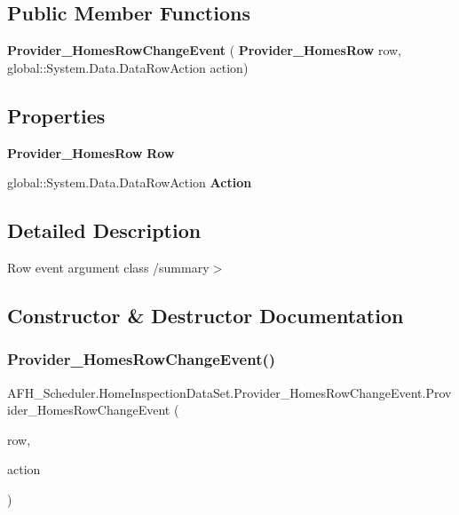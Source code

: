 \subsection*{Public Member Functions}
\begin{DoxyCompactItemize}
\item 
\textbf{ Provider\+\_\+\+Homes\+Row\+Change\+Event} (\textbf{ Provider\+\_\+\+Homes\+Row} row, global\+::\+System.\+Data.\+Data\+Row\+Action action)
\end{DoxyCompactItemize}
\subsection*{Properties}
\begin{DoxyCompactItemize}
\item 
\textbf{ Provider\+\_\+\+Homes\+Row} \textbf{ Row}\hspace{0.3cm}{\ttfamily  [get]}
\item 
global\+::\+System.\+Data.\+Data\+Row\+Action \textbf{ Action}\hspace{0.3cm}{\ttfamily  [get]}
\end{DoxyCompactItemize}


\subsection{Detailed Description}
Row event argument class /summary$>$ 

\subsection{Constructor \& Destructor Documentation}
\mbox{\label{class_a_f_h___scheduler_1_1_home_inspection_data_set_1_1_provider___homes_row_change_event_a87ef03713c7b0c6017398521a118b0b1}} 
\subsubsection{Provider\_HomesRowChangeEvent()}
{\footnotesize\ttfamily A\+F\+H\+\_\+\+Scheduler.\+Home\+Inspection\+Data\+Set.\+Provider\+\_\+\+Homes\+Row\+Change\+Event.\+Provider\+\_\+\+Homes\+Row\+Change\+Event (\begin{DoxyParamCaption}\item[{\textbf{ Provider\+\_\+\+Homes\+Row}}]{row,  }\item[{global\+::\+System.\+Data.\+Data\+Row\+Action}]{action }\end{DoxyParamCaption})}




